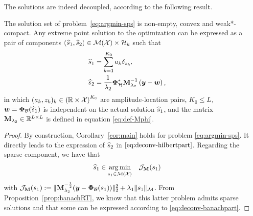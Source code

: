 \documentclass[12pt]{article}
\begin{document}
        The solutions are indeed decoupled, according to the following result.
        \begin{proposition}
            \label{prop:rt-applied}
            The solution set of problem~\eqref{eq:argmin-sps} is non-empty, convex and weak*-compact.
            Any extreme point solution to the optimization can be expressed as a pair of components $(\widehat{s}_1, \widehat{s}_2) \in {\mathcal{M}}({\mathcal{X}}) \times \mathcal{H}_k$ such that
            \begin{align}
                \widehat{s}_1 &= \sum_{k=1}^{K_0} a_k \delta_{z_k}, \label{eq:deconv-banachpart}\\
                \widehat{s}_2 &=  \frac{1}{\lambda_{2}}\bm{\Phi}_\mathcal{H}^* \mathbf{M}_{\lambda_{2}}^{-1} \left(\bm{y} - \bm{w}\right),\label{eq:deconv-hilbertpart}
            \end{align}
            in which $(a_k, z_k)_k \in \left(\mathbb{R} \times \mathcal{X}\right)^{K_0} $ are amplitude-location pairs, $K_0 \leq L$, $\bm{w} = \bm{\Phi}_\mathcal{B}(\widehat{s}_1)$ is independent on the actual solution $\widehat{s}_1$, and the matrix $\mathbf{M}_{\lambda_2} \in \mathbb{R}^{L \times L}$ is defined in equation \eqref{eq:def-Mphi}.
        \end{proposition}

        \begin{proof}
            By construction, Corollary~\ref{cor:main} holds for problem \eqref{eq:argmin-sps}. It directly leads to the expression of $\widehat{s}_2$ in $\eqref{eq:deconv-hilbertpart}$. Regarding the sparse component, we have that
            \begin{equation*}
                \widehat{s}_1 \in \underset{ s_1\in{\mathcal{M}}({\mathcal{X}})}{\arg\min} \quad  \mathcal{J}_{\mathbf{M}}(s_1)
            \end{equation*}
            with $\mathcal{J}_{\mathbf{M}}(s_1) := \|\mathbf{M}_{\lambda_{2}}^{-\frac{1}{2}} ( \bm{y} - \bm{\Phi}_\mathcal{B}(s_1)  ) \|_2^2  + \lambda_{1} \| s_1 \|_{\mathcal{M}}$. From Proposition~\ref{prop:banachRT}, we know that this latter problem admits sparse solutions and that some can be expressed according to \eqref{eq:deconv-banachpart}.
        \end{proof}
\end{document}
